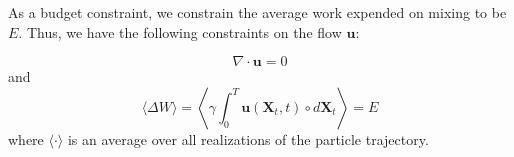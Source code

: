 \documentclass[12pt]{article}
\renewcommand{\vec}[1]{\mathbf{#1}}
\begin{document}
As a budget constraint, we  constrain the average work expended on mixing to be $E$. Thus, we have the following constraints on the flow $\vec{u}$:

\begin{equation}
\nabla \cdot \vec{u} = 0 
\end{equation}
and
\begin{equation}
\langle \Delta W \rangle = \left\langle \gamma \int _{0}^{T}\vec{u}(\vec{X}_t, t) \circ d \vec{X}_{t}  \right\rangle = E 
\end{equation}
where $\langle \cdot \rangle $ is an average over all realizations of the particle trajectory.







\end{document}
